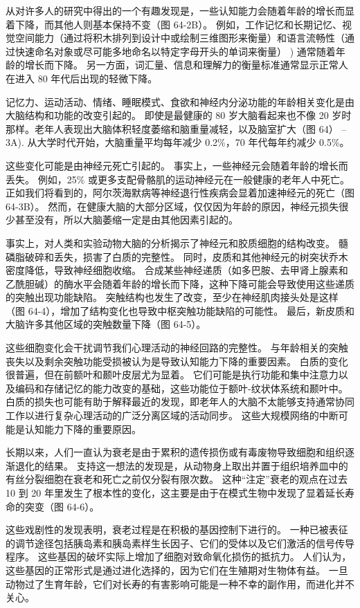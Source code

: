 从对许多人的研究中得出的一个有趣发现是，一些认知能力会随着年龄的增长而显着下降，而其他人则基本保持不变（图 64-2B）。 例如，工作记忆和长期记忆、视觉空间能力（通过将积木排列到设计中或绘制三维图形来衡量）和语言流畅性（通过快速命名对象或尽可能多地命名以特定字母开头的单词来衡量） ) 通常随着年龄的增长而下降。 另一方面，词汇量、信息和理解力的衡量标准通常显示正常人在进入 80 年代后出现的轻微下降。

记忆力、运动活动、情绪、睡眠模式、食欲和神经内分泌功能的年龄相关变化是由大脑结构和功能的改变引起的。 即使是最健康的 80 岁大脑看起来也不像 20 岁时那样。老年人表现出大脑体积轻度萎缩和脑重量减轻，以及脑室扩大（图 64） –3A). 从大学时代开始，大脑重量平均每年减少 0.2\%，70 年代每年约减少 0.5\%。

这些变化可能是由神经元死亡引起的。 事实上，一些神经元会随着年龄的增长而丢失。 例如，25\% 或更多支配骨骼肌的运动神经元在一般健康的老年人中死亡。 正如我们将看到的，阿尔茨海默病等神经退行性疾病会显着加速神经元的死亡（图 64-3B）。 然而，在健康大脑的大部分区域，仅仅因为年龄的原因，神经元损失很少甚至没有，所以大脑萎缩一定是由其他因素引起的。

事实上，对人类和实验动物大脑的分析揭示了神经元和胶质细胞的结构改变。 髓磷脂破碎和丢失，损害了白质的完整性。 同时，皮质和其他神经元的树突状乔木密度降低，导致神经细胞收缩。 合成某些神经递质（如多巴胺、去甲肾上腺素和乙酰胆碱）的酶水平会随着年龄的增长而下降，这种下降可能会导致使用这些递质的突触出现功能缺陷。 突触结构也发生了改变，至少在神经肌肉接头处是这样（图 64-4），增加了结构变化也导致中枢突触功能缺陷的可能性。 最后，新皮质和大脑许多其他区域的突触数量下降（图 64-5）。

这些细胞变化会干扰调节我们心理活动的神经回路的完整性。 与年龄相关的突触丧失以及剩余突触功能受损被认为是导致认知能力下降的重要因素。 白质的变化很普遍，但在前额叶和颞叶皮层尤为显着。 它们可能是执行功能和集中注意力以及编码和存储记忆的能力改变的基础，这些功能位于额叶-纹状体系统和颞叶中。 白质的损失也可能有助于解释最近的发现，即老年人的大脑不太能够支持通常协同工作以进行复杂心理活动的广泛分离区域的活动同步。 这些大规模网络的中断可能是认知能力下降的重要原因。

长期以来，人们一直认为衰老是由于累积的遗传损伤或有毒废物导致细胞和组织逐渐退化的结果。 支持这一想法的发现是，从动物身上取出并置于组织培养皿中的有丝分裂细胞在衰老和死亡之前仅分裂有限次数。 这种“注定”衰老的观点在过去 10 到 20 年里发生了根本性的变化，这主要是由于在模式生物中发现了显着延长寿命的突变（图 64-6）。

这些戏剧性的发现表明，衰老过程是在积极的基因控制下进行的。 一种已被表征的调节途径包括胰岛素和胰岛素样生长因子、它们的受体以及它们激活的信号传导程序。 这些基因的破坏实际上增加了细胞对致命氧化损伤的抵抗力。 人们认为，这些基因的正常形式是通过进化选择的，因为它们在生殖期对生物体有益。 一旦动物过了生育年龄，它们对长寿的有害影响可能是一种不幸的副作用，而进化并不关心。

